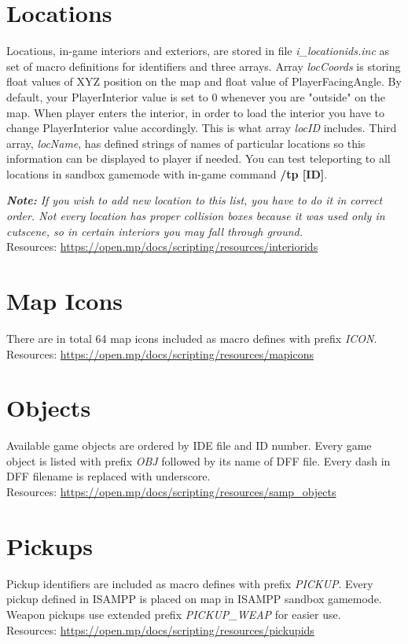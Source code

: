 \documentclass{article}
\begin{document}
\section{Locations}
\begin{sloppypar}
Locations, in-game interiors and exteriors, are stored in file \textit{i\_locationids.inc} as set of macro definitions for identifiers and three arrays. Array \textit{locCoords} is storing float values of XYZ position on the map and float value of PlayerFacingAngle. By default, your PlayerInterior value is set to 0 whenever you are "outside" on the map. When player enters the interior, in order to load the interior you have to change PlayerInterior value accordingly. This is what array \textit{locID} includes. Third array, \textit{locName}, has defined strings of names of particular locations so this information can be displayed to player if needed. You can test teleporting to all locations in sandbox gamemode with in-game command \textbf{/tp [ID]}.
\end{sloppypar}
\bigskip
\noindent \textit{\textbf{Note:} If you wish to add new location to this list, you have to do it in correct order. Not every location has proper collision boxes because it was used only in cutscene, so in certain interiors you may fall through ground.}
\bigskip
\\Resources: \url{https://open.mp/docs/scripting/resources/interiorids}

\section{Map Icons}
There are in total 64 map icons included as macro defines with prefix \textit{ICON}.
\bigskip
\\Resources: \url{https://open.mp/docs/scripting/resources/mapicons}

\section{Objects}
Available game objects are ordered by IDE file and ID number. Every game object is listed with prefix \textit{OBJ} followed by its name of DFF file. Every dash in DFF filename is replaced with underscore.
\bigskip
\\Resources: \url{https://open.mp/docs/scripting/resources/samp_objects}


\newpage
\section{Pickups}
Pickup identifiers are included as macro defines with prefix \textit{PICKUP}. Every pickup defined in ISAMPP is placed on map in ISAMPP sandbox gamemode. Weapon pickups use extended prefix \textit{PICKUP\_WEAP} for easier use.
\bigskip
\\Resources: \url{https://open.mp/docs/scripting/resources/pickupids}
\end{document}
